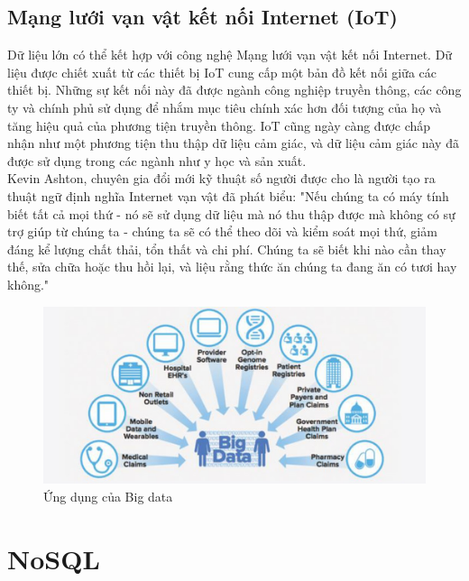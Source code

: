 \documentclass[12pt,a4paper]{report}
\begin{document}
\subsection{Mạng lưới vạn vật kết nối Internet (IoT)}
Dữ liệu lớn có thể kết hợp với công nghệ Mạng lưới vạn vật kết nối Internet. Dữ liệu được chiết xuất từ các thiết bị IoT cung cấp một bản đồ kết nối giữa các thiết bị. Những sự kết nối này đã được ngành công nghiệp truyền thông, các công ty và chính phủ sử dụng để nhắm mục tiêu chính xác hơn đối tượng của họ và tăng hiệu quả của phương tiện truyền thông. IoT cũng ngày càng được chấp nhận như một phương tiện thu thập dữ liệu cảm giác, và dữ liệu cảm giác này đã được sử dụng trong các ngành như y học và sản xuất.\\
Kevin Ashton, chuyên gia đổi mới kỹ thuật số người được cho là người tạo ra thuật ngữ định nghĩa Internet vạn vật đã phát biểu: "Nếu chúng ta có máy tính biết tất cả mọi thứ - nó sẽ sử dụng dữ liệu mà nó thu thập được mà không có sự trợ giúp từ chúng ta - chúng ta sẽ có thể theo dõi và kiểm soát mọi thứ, giảm đáng kể lượng chất thải, tổn thất và chi phí. Chúng ta sẽ biết khi nào cần thay thế, sửa chữa hoặc thu hồi lại, và liệu rằng thức ăn chúng ta đang ăn có tươi hay không."
\begin{figure}[h]
	\centering
	\includegraphics[scale=.3]{b-1.jpg}
	\caption{Ứng dụng của Big data}
\end{figure}
\section{NoSQL}
\end{document}
